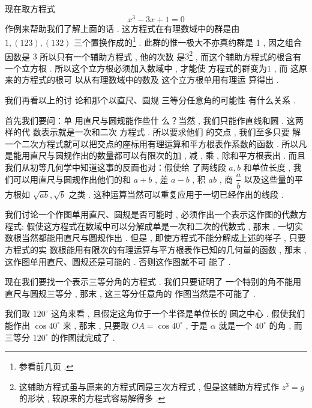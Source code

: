 现在取方程式
\[
x^{3}-3 x+1=0
\]
作例来帮助我们了解上面的话 . 这方程式在有理数域中的群是由 $1 , (123) , (132)$ 三个置换作成的\footnote{参看前几页 . } . 此群的惟一极大不亦真约群是 1 ,  因之组合因数是 $3$ 所以只有一个辅助方程式 , 他的次数 是$3$\footnote{这辅助方程式虽与原来的方程式同是三次方程式 , 但是这辅助方程式作 $z^{3}=g$ 的形状 ,  较原来的方程式容易解得多 . } , 而这个辅助方程式的根含有一个立方根 . 所以这个立方根必须加入数域中 , 才能使 方程式的群变为$1$ , 而 这原来的方程式的根可 以从有理数域中的数及 这个立方根单用有理运 算得出 . 

我们再看以上的讨 论和那个以直尺、圆规 三等分任意角的可能性 有什么关系 . 

首先我们要问：单 用直尺与圆规能作些什 么？当然 , 我们只能作直线和圆 . 这两样的代 数表示就是一次和二次 方程式 . 所以要求他们 的交点 , 我们至多只要 解一个二次方程式就可以把交点的座标用有理运算和平方根表作系数的函数 . 所以凡是能用直尺与圆规作出的数量都可以有限次的加 , 减 , 乘 ,  除和平方根表出 . 而且我们从初等几何学中知道这事的反面也对：假使给 了两线段 $a ,  b$ 和单位长度 , 我们可以用直尺与圆规作出他们的和
$a+b$ ,  差 $a-b$ ,  积 $a b$ ,  商 $\dfrac{a}{b}$ 以及这些量的平方根如 $\sqrt{a b} ,  \sqrt{b}$ 之类 . 这种运算当然可以重复应用于一切已经作出的线段 . 

我们讨论一个作图单用直尺、圆规是否可能时 , 必须作出一个表示这作图的代数方程式: 假使这方程式在数域中可以分解成单是一次和二次的代数式 , 那末 , 一切实数根当然都能用直尺与圆规作出 . 但是 , 即使方程式不能分解成上述的样子 , 只要方程式的实 数根能用有限次的有理运算与平方根表作已知的几何量的函数 ,  那末 , 这作图单用直尺、圆规还是可能的 . 否则这作图就不可 能了 . 

现在我们要找一个表示三等分角的方程式 . 我们只要证明了 一个特别的角不能用直尺与圆规三等分 , 那末 , 这三等分任意角的 作图当然是不可能了 . 

我们取 $120^{\circ}$ 这角来看 , 且假定这角位于一个半径是单位长的 圆之中心 . 假使我们能作出 $\cos 40^{\circ}$ 来 , 那末 , 只要取 $O A=\cos 40^{\circ}$ , 
于是 $\alpha$ 就是一个 $40^{\circ}$ 的角 , 而三等分 $120^{\circ}$ 的作图就完成了 . 





